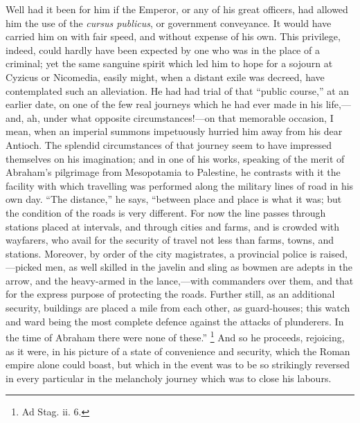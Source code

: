 Well had it been for him if the Emperor, or any of his great
officers, had allowed him the use of the \emph{cursus publicus}, or
government conveyance. It would have carried him on with fair speed,
and without expense of his own. This privilege, indeed, could hardly
have been expected by one who was in the place of a criminal; yet the
same sanguine spirit which led him to hope for a sojourn at Cyzicus or
Nicomedia, easily might, when a distant exile was decreed, have
contemplated such an alleviation. He had had trial of that
``public course,'' at an earlier date, on one of the few real
journeys which he had ever made in his life,—and, ah, under what
opposite circumstances!—on that memorable occasion, I mean, when an
imperial summons impetuously hurried him away from his dear Antioch.
The splendid circumstances of that journey seem to have impressed
themselves on his imagination; and in one of his works, speaking of
the merit of Abraham's pilgrimage from Mesopotamia to Palestine, he
contrasts with it the facility with which travelling was
performed along the military lines of road in his own day. ``The
distance,'' he says, ``between place and place is what it was;
but the condition of the roads is very different. For now the line
passes through stations placed at intervals, and through cities and
farms, and is crowded with wayfarers, who avail for the security of
travel not less than farms, towns, and stations. Moreover, by order of
the city magistrates, a provincial police is raised,—picked men, as
well skilled in the javelin and sling as bowmen are adepts in the
arrow, and the heavy-armed in the lance,—with commanders over them,
and that for the express purpose of protecting the roads. Further
still, as an additional security, buildings are placed a mile from
each other, as guard-houses; this watch and ward being the most
complete defence against the attacks of plunderers. In the time of
Abraham there were none of these.'' \footnote{Ad Stag. ii. 6.} And so he proceeds, rejoicing, as it were, in his picture of a
state of convenience and security, which the Roman empire alone could
boast, but which in the event was to be so strikingly reversed in
every particular in the melancholy journey which was to close his
labours.


